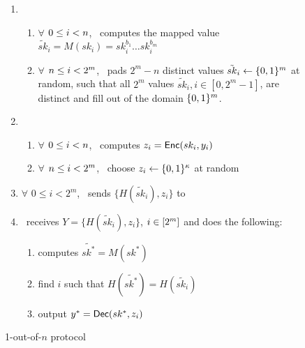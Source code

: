 \begin{figure}[h]
{\begin{minipage}{0.95\linewidth}
\begin{enumerate}
				\item 
				\begin{enumerate}
					\item $\forall$ $0\leq i < n$, \SS\ computes the mapped value $\tilde{sk}_{i} = M(sk_i)=sk^{b_1}_i\ldots sk^{b_m}_i$
					\item $\forall$ $n \leq i < 2^m$, \SS\ pads $2^m-n$ distinct values $\tilde{sk}_{i} \leftarrow\{0,1\}^m$ at random, such that all $2^m$ values $\tilde{sk}_{i}, i \in [0, 2^m-1]$, are distinct and fill out of the domain $\{0,1\}^m$.		
				\end{enumerate}
				\item  
				\begin{enumerate}
					\item $\forall$ $0\leq i < n$, \SS\ computes $z_i = \mathsf{Enc}(sk_i, y_i)$
					\item $\forall$ $n \leq i < 2^m$, \SS\ choose $z_i \leftarrow\{0,1\}^\kappa$ at random
				\end{enumerate}
				\item $\forall$ $0\leq i < 2^m$, \SS\ sends $\{H(\tilde{sk}_{i}), z_i\}$ to \RR\
				
				\item \RR\ receives $Y=\{H(\tilde{sk}_{i}), z_i\}$, $i\in[2^{m}]$ and does the following: 
				\begin{enumerate}
					\item computes $\tilde{sk^*} = M(sk^*)$
					\item find $i$ such that $H(\tilde{sk^*})= H(\tilde{sk_i})$
					\item output $y^*=\mathsf{Dec}(sk^*, z_i)$
				\end{enumerate}				
				
			\end{enumerate}				
		\end{minipage}
	}
	\caption{1-out-of-$n$ \OPPRF protocol}
	\label{fig:Cons1ssot}
\end{figure}


